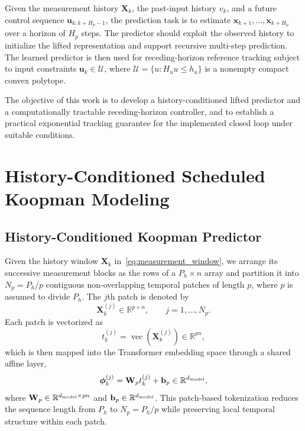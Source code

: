 \documentclass[journal]{IEEEtran}
\newcommand{\vphi}{\boldsymbol{\phi}}
\newcommand{\vb}{\mathbf{b}}
\newcommand{\vx}{\mathbf{x}}
\newcommand{\vu}{\mathbf{u}}
\newcommand{\mW}{\mathbf{W}}
\newcommand{\mX}{\mathbf{X}}
\newcommand{\R}{\mathbb{R}}
\begin{document}
Given the measurement history $\mX_k$, the past-input history $v_k$, and a future control sequence $\vu_{k:k+H_p-1}$, the prediction task is to estimate $\vx_{k+1},\ldots,\vx_{k+H_p}$ over a horizon of $H_p$ steps. The predictor should exploit the observed history to initialize the lifted representation and support recursive multi-step prediction. The learned predictor is then used for receding-horizon reference tracking subject to input constraints $\vu_k\in\mathcal U$, where $\mathcal U=\{u:H_uu\leq h_u\}$ is a nonempty compact convex polytope.

The objective of this work is to develop a history-conditioned lifted predictor and a computationally tractable receding-horizon controller, and to establish a practical exponential tracking guarantee for the implemented closed loop under suitable conditions.

\section{History-Conditioned Scheduled Koopman Modeling}
\label{sec:model}
\subsection{History-Conditioned Koopman Predictor}
\label{sec:temporal_lifting}
Given the history window $\mX_k$ in~\eqref{eq:measurement_window}, we arrange its successive measurement blocks as the rows of a $P_h\times n$ array and partition it into $N_p=P_h/p$ contiguous non-overlapping temporal patches of length $p$, where $p$ is assumed to divide $P_h$. The $j$th patch is denoted by
\begin{equation}
\mX_k^{(j)}\in\R^{p\times n},\qquad j=1,\ldots,N_p.
\label{eq:temporal_patch}
\end{equation}
Each patch is vectorized as
\begin{equation}
t_k^{(j)}=\operatorname{vec}(\mX_k^{(j)})\in\R^{pn},
\label{eq:patch_vec}
\end{equation}
which is then mapped into the Transformer embedding space through a shared affine layer,
\begin{equation}
\vphi_k^{(j)}=\mW_p t_k^{(j)}+\vb_p\in\R^{d_{\rm model}},
\label{eq:patch_embedding}
\end{equation}
where $\mW_p\in\R^{d_{\rm model}\times pn}$ and $\vb_p\in\R^{d_{\rm model}}$. This patch-based tokenization reduces the sequence length from $P_h$ to $N_p=P_h/p$ while preserving local temporal structure within each patch.
\end{document}
